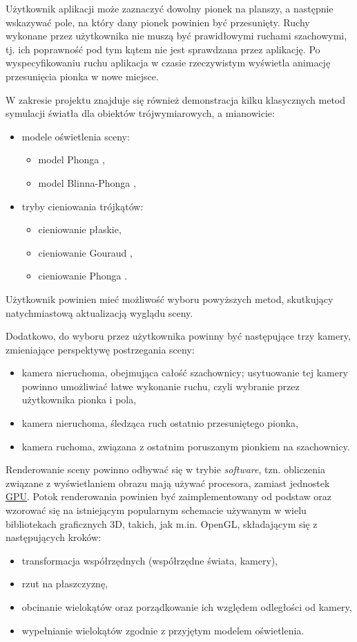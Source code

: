 \documentclass[10pt,a4paper]{article}
\begin{document}
Użytkownik aplikacji może zaznaczyć dowolny pionek na planszy, a następnie wskazywać pole, na który dany pionek powinien być przesunięty. Ruchy wykonane przez użytkownika nie muszą być prawidłowymi ruchami szachowymi, tj. ich poprawność pod tym kątem nie jest sprawdzana przez aplikację. Po wyspecyfikowaniu ruchu aplikacja w czasie rzeczywistym wyświetla animację przesunięcia pionka w nowe miejsce.

W zakresie projektu znajduje się również demonstracja kilku klasycznych metod symulacji światła dla obiektów trójwymiarowych, a mianowicie:
\begin{itemize}
	\item modele oświetlenia sceny:
	\begin{itemize}
		\item model Phonga \cite{phong75},
		\item model Blinna-Phonga \cite{blinn77},
	\end{itemize}
	\item tryby cieniowania trójkątów:
	\begin{itemize}
		\item cieniowanie płaskie,
		\item cieniowanie Gouraud \cite{gouraud71},
		\item cieniowanie Phonga \cite{phong75}.
	\end{itemize}
\end{itemize}
Użytkownik powinien mieć możliwość wyboru powyższych metod, skutkujący natychmiastową aktualizacją wyglądu sceny.

Dodatkowo, do wyboru przez użytkownika powinny być następujące trzy kamery, zmieniające perspektywę postrzegania sceny:
\begin{itemize}
	\item kamera nieruchoma, obejmująca całość szachownicy; usytuowanie tej kamery powinno umożliwiać łatwe wykonanie ruchu, czyli wybranie przez użytkownika pionka i pola,
	\item kamera nieruchoma, śledząca ruch ostatnio przesuniętego pionka,
	\item kamera ruchoma, związana z ostatnim poruszanym pionkiem na szachownicy.
\end{itemize}

Renderowanie sceny powinno odbywać się w trybie \emph{software}, tzn. obliczenia związane z wyświetlaniem obrazu mają używać procesora, zamiast jednostek \hyperref[abbr:gpu]{GPU}. Potok renderowania powinien być zaimplementowany od podstaw oraz wzorować się na istniejącym popularnym schemacie używanym w wielu bibliotekach graficznych 3D, takich, jak m.in. OpenGL, składającym się z następujących kroków:
\begin{itemize}
	\item transformacja współrzędnych (współrzędne świata, kamery),
	\item rzut na płaszczyznę,
	\item obcinanie wielokątów oraz porządkowanie ich względem odległości od kamery,
	\item wypełnianie wielokątów zgodnie z przyjętym modelem oświetlenia.
\end{itemize}
\end{document}
